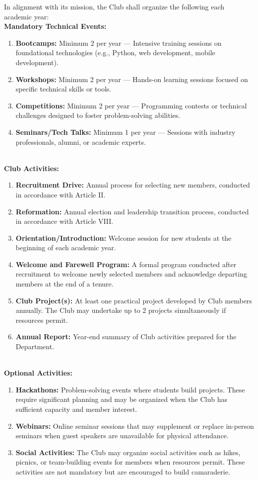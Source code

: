 In alignment with its mission, the Club shall organize the following each academic year:
\\
\textbf{Mandatory Technical Events:}
\begin{enumerate}[label=\alph*), leftmargin=2em, itemsep=0.3em]
    \item \textbf{Bootcamps:} Minimum 2 per year --- Intensive training sessions on foundational technologies (e.g., Python, web development, mobile development).
    \item \textbf{Workshops:} Minimum 2 per year --- Hands-on learning sessions focused on specific technical skills or tools.
    \item \textbf{Competitions:} Minimum 2 per year --- Programming contests or technical challenges designed to foster problem-solving abilities.
    \item \textbf{Seminars/Tech Talks:} Minimum 1 per year --- Sessions with industry professionals, alumni, or academic experts.
\end{enumerate}
\\
\textbf{Club Activities:}
\begin{enumerate}[label=\alph*), leftmargin=2em, itemsep=0.3em]
    \item \textbf{Recruitment Drive:} Annual process for selecting new members, conducted in accordance with Article II.
    \item \textbf{Reformation:} Annual election and leadership transition process, conducted in accordance with Article VIII.
    \item \textbf{Orientation/Introduction:} Welcome session for new students at the beginning of each academic year.
    \item \textbf{Welcome and Farewell Program:} A formal program conducted after recruitment to welcome newly selected members and acknowledge departing members at the end of a tenure.
    \item \textbf{Club Project(s):} At least one practical project developed by Club members annually. The Club may undertake up to 2 projects simultaneously if resources permit.
    \item \textbf{Annual Report:} Year-end summary of Club activities prepared for the Department.
\end{enumerate}
\\
\textbf{Optional Activities:}
\begin{enumerate}[label=\alph*), leftmargin=2em, itemsep=0.3em]
    \item \textbf{Hackathons:} Problem-solving events where students build projects. These require significant planning and may be organized when the Club has sufficient capacity and member interest.
    \item \textbf{Webinars:} Online seminar sessions that may supplement or replace in-person seminars when guest speakers are unavailable for physical attendance.
    \item \textbf{Social Activities:} The Club may organize social activities such as hikes, picnics, or team-building events for members when resources permit. These activities are not mandatory but are encouraged to build camaraderie.
\end{enumerate}

